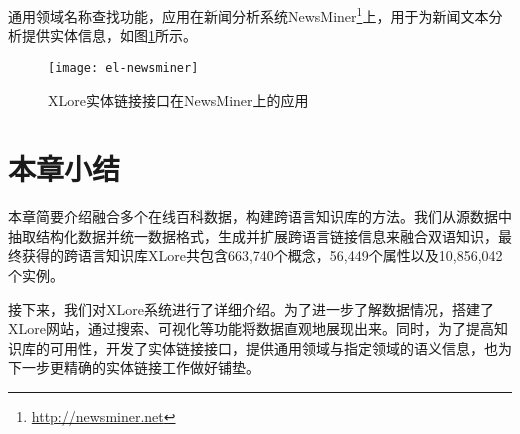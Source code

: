 通用领域名称查找功能，应用在新闻分析系统NewsMiner\footnote{\url{http://newsminer.net}}上，用于为新闻文本分析提供实体信息，如图\ref{fig:el-newsminer}所示。
\begin{figure}[ht]
  \centering
  \texttt{[image: el-newsminer]}
  \caption{XLore实体链接接口在NewsMiner上的应用}
  \label{fig:el-newsminer}
\end{figure}

\section{本章小结}
本章简要介绍融合多个在线百科数据，构建跨语言知识库的方法。我们从源数据中抽取结构化数据并统一数据格式，生成并扩展跨语言链接信息来融合双语知识，最终获得的跨语言知识库XLore共包含663,740个概念，56,449个属性以及10,856,042个实例。

接下来，我们对XLore系统进行了详细介绍。为了进一步了解数据情况，搭建了XLore网站，通过搜索、可视化等功能将数据直观地展现出来。同时，为了提高知识库的可用性，开发了实体链接接口，提供通用领域与指定领域的语义信息，也为下一步更精确的实体链接工作做好铺垫。

